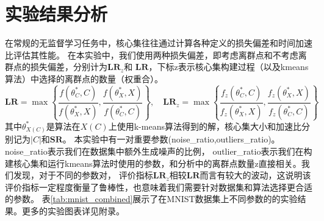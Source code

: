\section{实验结果分析}

在常规的无监督学习任务中，核心集往往通过计算各种定义的损失偏差和时间加速比评估其性能。
在本实验中，我们使用两种损失偏差，即考虑离群点和不考虑离群点的损失偏差，分别计为$\mathbf{LR}_z$和
$\mathbf{LR}$，下标z表示核心集构建过程（以及kmeans算法）中选择的离群点的数量（权重合）。
\begin{equation*}
    \mathbf{LR} = \max\left\{\frac{f(\theta^*_C,C)}{f(\theta^*_X,X)},\frac{f(\theta^*_X,X)}{f(\theta^*_C,C)}\right\},\quad
    \mathbf{LR}_z = \max\left\{\frac{f_z(\theta^*_C,C)}{f_z(\theta^*_X,X)},\frac{f_z(\theta^*_X,X)}{f_z(\theta^*_C,C)}\right\}
\end{equation*}
其中$\theta^*_{X(C)}$是算法在$X(C)$上使用k-means算法得到的解，核心集大小和加速比分别记为$|C|$和$\mathbf{SR}$。
本实验中有一对重要参数(noise\_ratio,outliers\_ratio)。noise\_ratio表示我们在数据集中额外生成噪声的比例，
outlier\_ratio表示我们在构建核心集和运行kmeans算法时使用的参数，和分析中的离群点数量z直接相关。我们发现，对于不同的参数对，
评价指标$\mathbf{LR}_z$相较$\mathbf{LR}$而言有较大的波动，这说明该评价指标一定程度衡量了鲁棒性，也意味着我们需要针对数据集和算法选择更合适的参数。
表\ref{tab:mnist_combined}展示了在MNIST数据集上不同参数的的实验结果。更多的实验图表详见附录。


